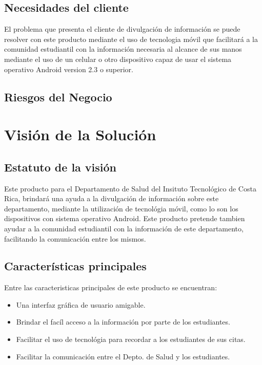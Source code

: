 \documentclass[12pt]{article}
\begin{document}
\subsection{Necesidades del cliente}

El problema que presenta el cliente de divulgaci\'on de informaci\'on se puede resolver con este producto mediante el uso de tecnologia m\'ovil que facilitar\'a a la comunidad estudiantil con la informaci\'on necesaria al alcance de sus manos mediante el uso de un celular o otro dispositivo capaz de usar el sistema operativo Android version 2.3 o superior.

\subsection{Riesgos del Negocio}


\newpage
\section{Visi\'on de la Soluci\'on}

\subsection{Estatuto de la visi\'on}

Este producto para el Departamento de Salud del Insituto Tecnol\'ogico de Costa Rica, brindar\'a una ayuda a la divulgaci\'on de informaci\'on sobre este departamento, mediante la utilizaci\'on de tecnol\'ogia m\'ovil, como lo son los dispositivos con sistema operativo Android. Este producto pretende tambien ayudar a la comunidad estudiantil con la informaci\'on de este departamento, facilitando la comunicaci\'on entre los mismos.

\subsection{Características principales}

Entre las caracteristicas principales de este producto se encuentran:
\begin{itemize}
	\item{Una interfaz gr\'afica de usuario amigable.}
	\item{Brindar el fac\'il acceso a la informaci\'on por parte de los estudiantes.}
	\item{Facilitar el uso de tecnol\'ogia para recordar a los estudiantes de sus citas.}
	\item{Facilitar la comunicaci\'on entre el Depto. de Salud y los estudiantes.}
\end{itemize}
\end{document}
